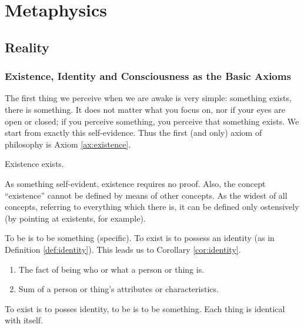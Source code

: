 \part{Metaphysics}

\chapter{Reality}

    \section{Existence, Identity and Consciousness as the Basic Axioms}

        The first thing we perceive when we are awake is very simple: something exists, there is something. It does not matter what you focus on, nor if your eyes are open or closed; if you perceive something, you perceive that something exists. We start from exactly this self-evidence. Thus the first (and only) axiom of philosophy is Axiom \ref{ax:existence}.
    
            \begin{axiom}[Existence]
            \label{ax:existence}
                Existence exists.
            \end{axiom}
            
        As something self-evident, existence requires no proof. Also, the concept ``existence'' cannot be defined by means of other concepts. As the widest of all concepts, referring to everything which there is, it can be defined only ostensively (by pointing at existents, for example).

        To be is to be something (specific). To exist is to possess an identity (as in Definition \ref{def:identity}). This leads us to Corollary \ref{cor:identity}.
            
            \begin{definition}[Identity]
            \label{def:identity}
                \begin{enumerate}
                    \item The fact of being who or what a person or thing is.
                    \item Sum of a person or thing's attributes or characteristics.
                \end{enumerate}
            \end{definition}
        
            \begin{axiom}
            \label{cor:identity}
                To exist is to posses identity, to be is to be something. Each thing is identical with itself.
            \end{axiom}

